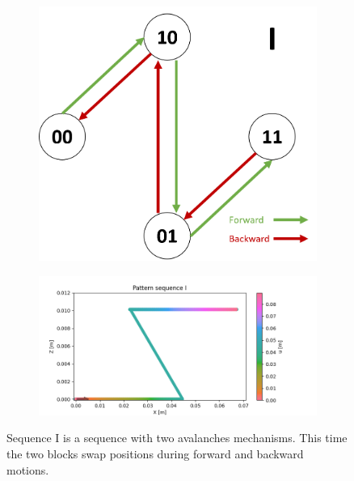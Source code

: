         \begin{figure}[h]
            \centering
            \begin{subfigure}{.2\textwidth}
            \includegraphics[width=\textwidth]{images/S_I.png}
            \end{subfigure}%
            \begin{subfigure}{.6\textwidth}
            \includegraphics[width=\textwidth]{images/I.png}
            \end{subfigure}
            \caption{Sequence I is a sequence with two avalanches mechanisms. This time the two blocks swap positions during forward and backward motions.}
        \end{figure} 
        

